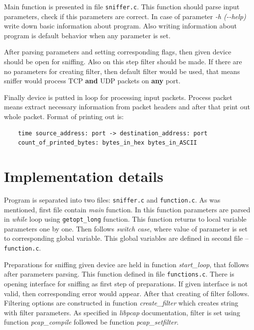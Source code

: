 \documentclass[12pt,a4paper]{article}
\begin{document}
Main function is presented in file \texttt{sniffer.c}. This function should 
parse input parameters, check if this parameters are correct. In case of 
parameter \textit{-h (-{}-help)} write down basic information about program. 
Also writing information about program is default behavior when any parameter is 
set. 

After parsing parameters and setting corresponding flags, then given device 
should be open for sniffing. Also on this step filter should be made. If there 
are no parameters for creating filter, then default filter would be used, that 
means sniffer would process TCP \textbf{and} UDP packets on \textbf{any} port. 

Finally device is putted in loop for processing input packets. Process packet 
means extract necessary information from packet headers and after that print out 
whole packet. Format of printing out is:
\begin{verbatim}
    time source_address: port -> destination_address: port
    count_of_printed_bytes: bytes_in_hex bytes_in_ASCII
\end{verbatim}    


\section{Implementation details}

Program is separated into two files: \texttt{sniffer.c} and \texttt{function.c}. 
As was mentioned, first file contain \textit{main} function. In this function 
parameters are parsed in \textit{while} loop using \texttt{getopt\_long} function. 
This function returns to local variable parameters one by one. Then follows  
\textit{switch case}, where value of parameter is set to corresponding global 
variable. This global variables are defined in second file -- \texttt{function.c}. 

Preparations for sniffing given device are held in function \textit{start\_loop}, 
that follows after parameters parsing. This function defined in file 
\texttt{functions.c}. There is opening interface for sniffing as first step of 
preparations. If given interface is not valid, then corresponding error would 
appear. After that creating of filter follows. Filtering options are constructed 
in function \textit{create\_filter} which creates string with filter parameters. 
As specified in \textit{libpcap} documentation, filter is set using function 
\textit{pcap\_compile} followed be function \textit{pcap\_setfilter}. 
\end{document}
